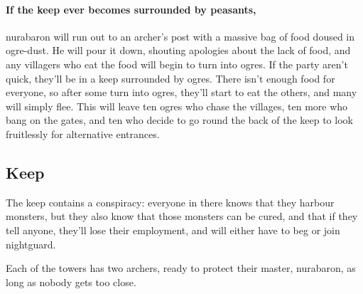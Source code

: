 \begin{multicols}{2}
\paragraph{If the keep ever becomes surrounded by peasants,}
\gls{nurabaron} will run out to an archer's post with a massive bag of food doused in ogre-dust.
He will pour it down, shouting apologies about the lack of food, and any villagers who eat the food will begin to turn into ogres.
If the party aren't quick, they'll be in a keep surrounded by ogres.
There isn't enough food for everyone, so after some turn into ogres, they'll start to eat the others, and many will simply flee.
This will leave ten ogres who chase the villages, ten more who bang on the gates, and ten who decide to go round the back of the keep to look fruitlessly for alternative entrances.

\subsection*{ Keep}


\setcounter{list}{0}

The keep contains a conspiracy: everyone in there knows that they harbour monsters, but they also know that those monsters can be cured, and that if they tell anyone, they'll lose their employment, and will either have to beg or join \gls{nightguard}.


Each of the towers has two archers, ready to protect their master, \gls{nurabaron}, as long as nobody gets too close.


\begin{figure*}[t!]

\begin{multicols}{2}



\end{multicols}

\end{figure*}

\begin{figure*}[b!]
\begin{multicols}{2}


\end{multicols}
\end{figure*}
\end{multicols}
